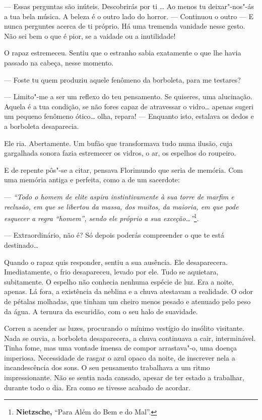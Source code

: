 --- Essas perguntas são inúteis. Descobrirás por ti \ldots{} Ao menos tu
deixar"-nos"-ás a tua bela música. A beleza é o outro lado do horror. ---
Continuou o outro --- E nunca perguntes acerca de ti próprio. Há uma
tremenda vanidade nesse gesto. Não sei bem o que é pior, se a vaidade ou
a inutilidade!

O rapaz estremeceu. Sentiu que o estranho sabia exatamente o que lhe
havia passado na cabeça, nesse momento.

--- Foste tu quem produziu aquele fenômeno da borboleta, para me testares?

--- Limito"-me a ser um reflexo do teu pensamento. Se quiseres, uma
alucinação. Aquela é a tua condição, se não fores capaz de atravessar o
vidro\ldots{} apenas sugeri um pequeno fenômeno ótico\ldots{} olha, repara! ---
Enquanto isto, estalava os dedos e a borboleta desaparecia.

Ele ria. Abertamente. Um bufão que transformava tudo numa ilusão, cuja
gargalhada sonora fazia estremecer os vidros, o ar, os espelhos do
roupeiro.

E de repente pôs"-se a citar, pensava Florimundo que seria de memória.
Com uma memória antiga e perfeita, como a de um sacerdote:

--- \emph{``Todo o homem de elite aspira instintivamente à sua torre de
marfim e reclusão, em que se libertou da massa, dos muitos, da maioria,
em que pode esquecer a regra ``homem'', sendo ele próprio a sua
exceção\ldots{}''}\footnote{\textbf{Nietzsche,
  }``Para Além do Bem e do Mal''.}.

--- Extraordinário, não é? Só depois poderás compreender o que te está
destinado\ldots{}

Quando o rapaz quis responder, sentiu a sua ausência. Ele desaparecera.
Imediatamente, o frio desapareceu, levado por ele. Tudo se aquietara,
subitamente. O espelho não conhecia nenhuma espécie de luz. Era a noite,
apenas. Lá fora, a existência da neblina e a chuva atestavam a
realidade. O odor de pétalas molhadas, que tinham um cheiro menos pesado
e atenuado pelo peso da água. A ternura da escuridão, com o seu halo de
suavidade.

Correu a acender as luzes, procurando o mínimo vestígio do insólito
visitante. Nada se ouvia, a borboleta desaparecera, a chuva continuava a
cair, interminável. Tinha fome, mas uma vontade imensa de compor
arrastava"-o, uma doença imperiosa. Necessidade de rasgar o azul opaco da
noite, de inscrever nela a incandescência dos sons. O seu pensamento
trabalhava a um ritmo impressionante. Não se sentia nada cansado, apesar
de ter estado a trabalhar, durante todo o dia. Era como se tivesse
acabado de acordar.

